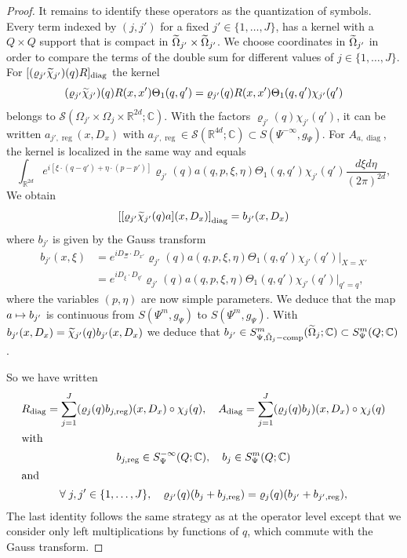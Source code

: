 \documentclass[AHL,Unicode,longabstracts]{cedram}
\newcommand{\C}{\mathbb{C}}
\newcommand{\R}{\mathbb{R}}
\newcommand{\clS}{\mathcal{S}}
\DeclareMathOperator{\ccomp}{comp}
\DeclareMathOperator{\diag}{diag}
\DeclareMathOperator{\reg}{reg}
\let\oldtilde\tilde
\renewcommand*{\tilde}[1]{\mathchoice{\widetilde{#1}}{\widetilde{#1}}{\oldtilde{#1}}{\oldtilde{#1}}}
\let\oldforall\forall
\renewcommand*{\forall}{\mathrel{\oldforall}}
\let\originalleft\left
\let\originalright\right
\renewcommand{\left}{\mathopen{}\mathclose\bgroup\originalleft}
\renewcommand{\right}{\aftergroup\egroup\originalright}
\let\oldmapsto\mapsto
\renewcommand*{\mapsto}{\mathchoice{\longmapsto}{\oldmapsto}{\oldmapsto}{\oldmapsto}}
\begin{document}
\begin{proof}
It remains to identify these operators as the quantization of symbols. Every term indexed by $(j,j')$ for a fixed $j'\in \{1,\dots,J\}$, has a kernel with a $Q\times Q$ support that is compact in $\tilde{\Omega}_{j'}\times\tilde{\Omega}_{j'}$. We choose coordinates in $\tilde{\Omega}_{j'}$ in order to compare the terms of the double sum for different values of $j\in \{1,\dots,J\}$. For $[(\varrho_{j'}\tilde{\chi}_{j'})(q)R]_{\diag}$ the kernel
\[
(\varrho_{j'}\tilde{\chi}_{j'})(q)R(x,x')\Theta_{1}(q,q')=\varrho_{j'}(q)R(x,x')\Theta_{1}(q,q')\chi_{j'}(q')
\]
belongs to $\clS(\Omega_{j'}\times \Omega_{j}\times \R^{2d};\C)$. With the factors $\varrho_{j'}(q)\chi_{j'}(q')$, it can be written $a_{j',\reg}(x,D_{x})$ with $a_{j',\reg}\in \clS(\R^{4d};\C)\subset S(\Psi^{-\infty},g_{\Psi})$.
For $A_{a,\diag}$, the kernel is localized in the same way and equals
\[
\int_{\R^{2d}}e^{i[\xi\cdot(q-q')+\eta\cdot(p-p')]}\varrho_{j'}(q)a(q,p,\xi,\eta)\Theta_{1}(q,q')\chi_{j'}(q')\frac{d\xi d\eta}{(2\pi)^{2d}},
\]
We obtain
\[
\left[[\varrho_{j'}\tilde{\chi}_{j'}(q)a](x,D_{x})\right]_{\diag}=b_{j'}(x,D_{x})
\]
where $b_{j'}$ is given by the Gauss transform
\begin{align*}
b_{j'}(x,\xi)&=e^{iD_{\Xi}\cdot D_{x'}}\varrho_{j'}(q)a(q,p,\xi,\eta)\Theta_{1}(q,q')\chi_{j'}(q')\big|_{X=X'}\\
&=e^{iD_{\xi}\cdot D_{q'}}\varrho_{j'}(q)a(q,p,\xi,\eta)\Theta_{1}(q,q')\chi_{j'}(q')\big|_{q'=q},
\end{align*}
where the variables $(p,\eta)$ are now simple parameters. We deduce that the map $a\mapsto b_{j'}$ is continuous from $S(\Psi^{m},g_{\Psi})$ to $S(\Psi^{m},g_{\Psi})$. With $b_{j'}(x,D_{x})=\tilde{\chi}_{j'}(q)b_{j'}(x,D_{x})$ we deduce that $b_{j'}\in S^{m}_{\Psi,\tilde{\Omega}_{j}-\ccomp}(\tilde{\Omega}_{j};\C)\subset S^{m}_{\Psi}(Q;\C)$.

So we have written
\begin{gather*}
 R_{\diag}=\sum_{j=1}^{J} (\varrho_{j}(q)b_{j,\reg})(x,D_{x})\circ \chi_{j}(q),\quad A_{\diag}=\sum_{j=1}^{J}(\varrho_{j}(q)b_{j})(x,D_{x})\circ \chi_{j}(q)\\
\intertext{with} b_{j,\reg}\in S^{-\infty}_{\Psi}(Q;\C),\quad b_{j}\in S^{m}_{\Psi}(Q;\C)\\
\intertext{and}
\forall j,j'\in \left\{1,\dots,J\right\},\quad
\varrho_{j'}(q)(b_{j}+b_{j,\reg})=\varrho_{j}(q)(b_{j'}+b_{j',\reg}),
\end{gather*}
The last identity follows the same strategy as at the operator level except that we consider only left multiplications by functions of $q$, which commute with the Gauss transform.
\end{proof}
\end{document}
